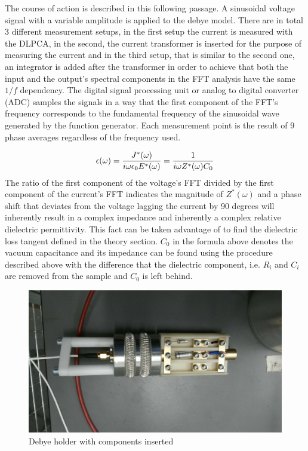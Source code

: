 The course of action is described in this following passage.
\newline
A sinusoidal voltage signal with a variable amplitude is applied to the debye model. There are in total 3 different measurement setups,
in the first setup the current is measured with the DLPCA, in the second, the current transformer is inserted for the purpose of measuring 
the current and in the third setup, that is similar to the second one, an integrator is added after the transformer in order
to achieve that both the input and the output's spectral components in the FFT analysis have the same $1/f$ dependency.
The digital signal processing unit or analog to digital converter (ADC) samples the signals in a way that 
the first component of the FFT's frequency corresponds to the fundamental frequency
of the sinusoidal wave generated by the function generator. Each measurement point is the result of 9 phase averages regardless of the frequency used.



\begin{equation}
\epsilon(\omega)=\frac{J^*(\omega)}{i \omega \epsilon_0 E^*(\omega)} = \frac{1}{i \omega Z^*(\omega) C_0}\\
\end{equation}
The ratio of the first component of the voltage's FFT divided by the first component of the current's FFT indicates the magnitude
of $Z^*(\omega)$ and a phase shift that deviates from the voltage lagging the current by 90 degrees will inherently result in a complex impedance and
inherently a complex relative dielectric permittivity. This fact can be
taken advantage of to find the dielectric loss tangent defined in the theory section.
\newline
$C_0$ in the formula above denotes the vacuum capacitance and its impedance can be found using the procedure described above with the difference that
the dielectric component, i.e. $R_i$ and $C_i$ are removed from the sample and $C_0$ is left behind.

\begin{figure}[h!tb]
 \centering
 \begin{minipage}{0.4\textwidth}
 \includegraphics[width=\textwidth]{figures/Method/Experimentaufbau/debyesample}
 \caption[Kurze Abbildungsbeschreibung]{Debye holder with components inserted}
 \end{minipage}\qquad
 
 
 \end{figure}

